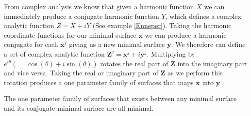 From complex analysis we know that given a harmonic function $X$ we can immediately produce a conjugate harmonic function $Y$, which defines a complex analytic function $Z = X + i Y$ (See example \ref{Enneper}). Taking the harmonic coordinate functions for our minimal surface $\mathbf x$ we can produce a harmonic conjugate for each $\mathbf x^j$ giving us a new minimal surface $\mathbf y$. We therefore can define a set of complex analytic function $\mathbf Z^j = \mathbf x^j + i \mathbf y^j$. Multiplying by $e^{i\theta} (= \cos(\theta)+i\sin(\theta))$ rotates the real part of $\mathbf Z$ into the imaginary part and vice versa. Taking the real or imaginary part of $\mathbf Z$ as we perform this rotation produces a one parameter family of surfaces that maps $\mathbf x$ into $\mathbf y$.

\begin{theorem}
The one parameter family of surfaces that exists between any minimal surface and its conjugate minimal surface are all minimal.
\end{theorem}

